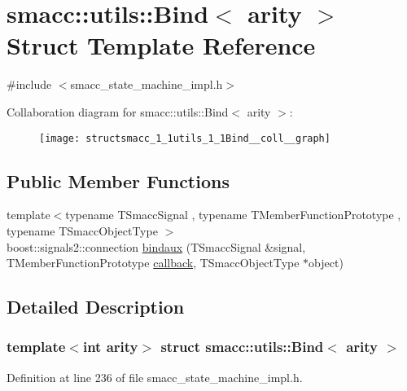 \hypertarget{structsmacc_1_1utils_1_1Bind}{}\section{smacc\+:\+:utils\+:\+:Bind$<$ arity $>$ Struct Template Reference}
\label{structsmacc_1_1utils_1_1Bind}


{\ttfamily \#include $<$smacc\+\_\+state\+\_\+machine\+\_\+impl.\+h$>$}



Collaboration diagram for smacc\+:\+:utils\+:\+:Bind$<$ arity $>$\+:
\nopagebreak
\begin{figure}[H]
\begin{center}
\leavevmode
\texttt{[image: structsmacc\_1\_1utils\_1\_1Bind\_\_coll\_\_graph]}
\end{center}
\end{figure}
\subsection*{Public Member Functions}
\begin{DoxyCompactItemize}
\item 
{\footnotesize template$<$typename T\+Smacc\+Signal , typename T\+Member\+Function\+Prototype , typename T\+Smacc\+Object\+Type $>$ }\\boost\+::signals2\+::connection \hyperlink{structsmacc_1_1utils_1_1Bind_aa0f4ba76fbd5fdb865df51b61d4269f3}{bindaux} (T\+Smacc\+Signal \&signal, T\+Member\+Function\+Prototype \hyperlink{3_2servers_2opencv__perception__node_2opencv__perception__node_8cpp_a050e697bd654facce10ea3f6549669b3}{callback}, T\+Smacc\+Object\+Type $\ast$object)
\end{DoxyCompactItemize}


\subsection{Detailed Description}
\subsubsection*{template$<$int arity$>$\newline
struct smacc\+::utils\+::\+Bind$<$ arity $>$}



Definition at line 236 of file smacc\+\_\+state\+\_\+machine\+\_\+impl.\+h.



